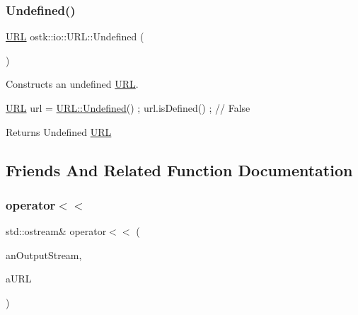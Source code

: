 \subsubsection{\texorpdfstring{Undefined()}{Undefined()}}
{\footnotesize\ttfamily \hyperlink{classostk_1_1io_1_1_u_r_l}{U\+RL} ostk\+::io\+::\+U\+R\+L\+::\+Undefined (\begin{DoxyParamCaption}{ }\end{DoxyParamCaption})\hspace{0.3cm}{\ttfamily [static]}}



Constructs an undefined \hyperlink{classostk_1_1io_1_1_u_r_l}{U\+RL}. 


\begin{DoxyCode}
\hyperlink{classostk_1_1io_1_1_u_r_l_a2537e046cef4ac966cc295abb81279c2}{URL} url = \hyperlink{classostk_1_1io_1_1_u_r_l_a668bfbf59c42356063be619b5f39d613}{URL::Undefined}() ;
url.isDefined() ; \textcolor{comment}{// False}
\end{DoxyCode}


\begin{DoxyReturn}{Returns}
Undefined \hyperlink{classostk_1_1io_1_1_u_r_l}{U\+RL} 
\end{DoxyReturn}


\subsection{Friends And Related Function Documentation}
\mbox{\label{classostk_1_1io_1_1_u_r_l_a98ed4737303253c4105846425180fc30}} 
\subsubsection{\texorpdfstring{operator$<$$<$}{operator<<}}
{\footnotesize\ttfamily std\+::ostream\& operator$<$$<$ (\begin{DoxyParamCaption}\item[{std\+::ostream \&}]{an\+Output\+Stream,  }\item[{const \hyperlink{classostk_1_1io_1_1_u_r_l}{U\+RL} \&}]{a\+U\+RL }\end{DoxyParamCaption})\hspace{0.3cm}{\ttfamily [friend]}}



